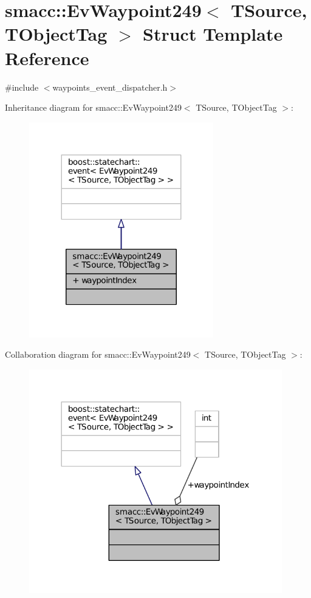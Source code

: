 \hypertarget{structsmacc_1_1EvWaypoint249}{}\section{smacc\+:\+:Ev\+Waypoint249$<$ T\+Source, T\+Object\+Tag $>$ Struct Template Reference}
\label{structsmacc_1_1EvWaypoint249}


{\ttfamily \#include $<$waypoints\+\_\+event\+\_\+dispatcher.\+h$>$}



Inheritance diagram for smacc\+:\+:Ev\+Waypoint249$<$ T\+Source, T\+Object\+Tag $>$\+:
\nopagebreak
\begin{figure}[H]
\begin{center}
\leavevmode
\includegraphics[width=227pt]{structsmacc_1_1EvWaypoint249__inherit__graph}
\end{center}
\end{figure}


Collaboration diagram for smacc\+:\+:Ev\+Waypoint249$<$ T\+Source, T\+Object\+Tag $>$\+:
\nopagebreak
\begin{figure}[H]
\begin{center}
\leavevmode
\includegraphics[width=312pt]{structsmacc_1_1EvWaypoint249__coll__graph}
\end{center}
\end{figure}
